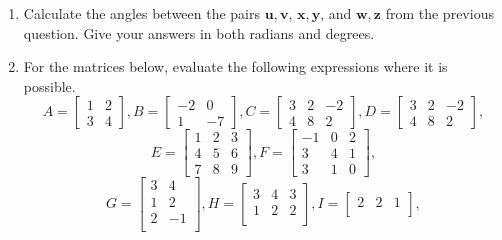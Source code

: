 \documentclass[11pt,a4paper,titlepage,oneside,openany]{article}
\numberwithin{equation}{section}
\numberwithin{algorithm}{section}
\numberwithin{figure}{section}
\numberwithin{table}{section}
\renewcommand{\vec}[1]{\mathbf{#1}}
\begin{document}
\begin{enumerate}
		\item
		Calculate the angles between the pairs $\vec{u},\vec{v}$, $\vec{x},\vec{y}$, and $\vec{w},\vec{z}$ from the previous question. Give your answers in both radians and degrees.
		
		\item
		For the matrices below, evaluate the following expressions where it is possible.
		\begin{equation*}
		A=\left[ \begin{array}{cc} 1  & 2 \\ 3 & 4 \end{array}\right],
		B=\left[ \begin{array}{cc} -2  & 0 \\ 1 & -7 \end{array}\right],
		C=\left[ \begin{array}{ccc} 3  & 2 & -2 \\ 4 & 8 & 2 \end{array}\right],
		D=\left[ \begin{array}{ccc} 3  & 2 & -2 \\ 4 & 8 & 2 \end{array}\right],
		\end{equation*}
		\begin{equation*}
		E=\left[ \begin{array}{ccc} 1  & 2 & 3 \\ 4 & 5 & 6 \\ 7 & 8 & 9 \end{array}\right],
		F=\left[ \begin{array}{ccc} -1  & 0 & 2 \\ 3 & 4 & 1 \\  3 & 1 & 0 \end{array}\right],
		\end{equation*}
		\begin{equation*}
		G=\left[ \begin{array}{cc}3 & 4 \\1 & 2 \\2 &-1 \\ \end{array}\right],
		H=\left[ \begin{array}{ccc}3 & 4 & 3\\1 & 2 & 2\\ \end{array}\right],
		I=\left[ \begin{array}{ccc}2 & 2 & 1\\ \end{array}\right],

\end{equation*}
\end{enumerate}
\end{document}
